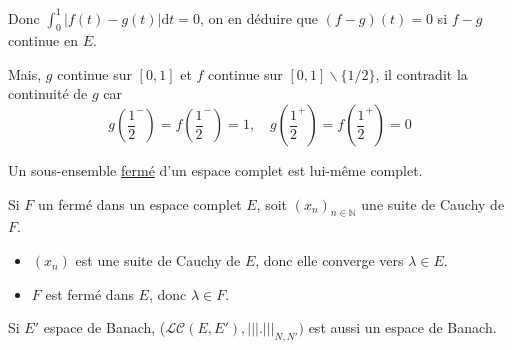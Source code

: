 \begin{myproof}{}{}
\begin{enumerate}
\begin{itemize}
  Donc $\int_{0}^{1} |f(t) - g(t)| \mathrm{d} t = 0$, on en déduire que $(f-g)(t) = 0$ si $f-g$ continue en $E$.
  
  Mais, $g$ continue sur $[0,1]$ et $f$ continue sur $[0,1] \backslash \{1/2\}$, il contradit la continuité de $g$ car 
  \[
    g \left( \frac{1}{2} ^{-} \right) = f \left( \frac{1}{2} ^{-} \right) = 1, \quad
    g \left( \frac{1}{2} ^{+} \right) = f \left( \frac{1}{2} ^{+} \right) = 0
  \]

\end{itemize}


    
\end{enumerate}
\end{myproof}

\begin{Prop}{}{}
Un sous-ensemble \underline{fermé} d'un espace complet est lui-même complet.
\end{Prop}

\begin{myproof}{}{}
Si $F$ un fermé dans un espace complet $E$, soit $(x_n) _{n \in \mathbb{N}}$ une suite de Cauchy de $F$. 

\begin{itemize}

    \item $(x_n)$ est une suite de Cauchy de $E$, donc elle converge vers $\lambda \in E$.

    \item $F$ est fermé dans $E$, donc $\lambda \in F$.
\end{itemize}
\end{myproof}



\begin{Prop}{}{}
  Si $E'$ espace de Banach, ($\mathscr{LC}(E, E'), \vert\vert\vert . \vert\vert\vert _{N, N'})$ est aussi un espace de Banach.
\end{Prop}

